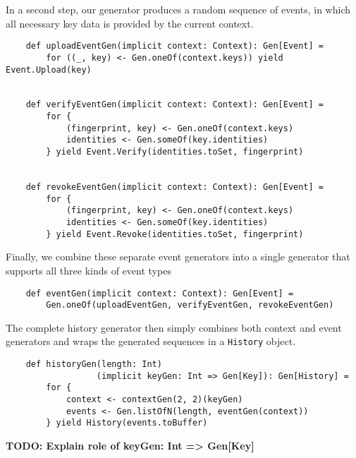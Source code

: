 In a second step, our generator produces a random sequence of events, in which all necessary key data is provided by the current context.

\begin{verbatim}
    def uploadEventGen(implicit context: Context): Gen[Event] =
        for ((_, key) <- Gen.oneOf(context.keys)) yield Event.Upload(key)


    def verifyEventGen(implicit context: Context): Gen[Event] =
        for {
            (fingerprint, key) <- Gen.oneOf(context.keys)
            identities <- Gen.someOf(key.identities)
        } yield Event.Verify(identities.toSet, fingerprint)


    def revokeEventGen(implicit context: Context): Gen[Event] =
        for {
            (fingerprint, key) <- Gen.oneOf(context.keys)
            identities <- Gen.someOf(key.identities)
        } yield Event.Revoke(identities.toSet, fingerprint)
\end{verbatim}

Finally, we combine these separate event generators into a single generator that supports all three kinds of event types

\begin{verbatim}
    def eventGen(implicit context: Context): Gen[Event] =
        Gen.oneOf(uploadEventGen, verifyEventGen, revokeEventGen)
\end{verbatim}

The complete history generator then simply combines both context and event generators and wraps the generated sequences in a \texttt{History} object.

\begin{verbatim}
    def historyGen(length: Int)
                  (implicit keyGen: Int => Gen[Key]): Gen[History] =
        for {
            context <- contextGen(2, 2)(keyGen)
            events <- Gen.listOfN(length, eventGen(context))
        } yield History(events.toBuffer)
\end{verbatim}

\textbf{TODO: Explain role of keyGen: Int => Gen[Key]}